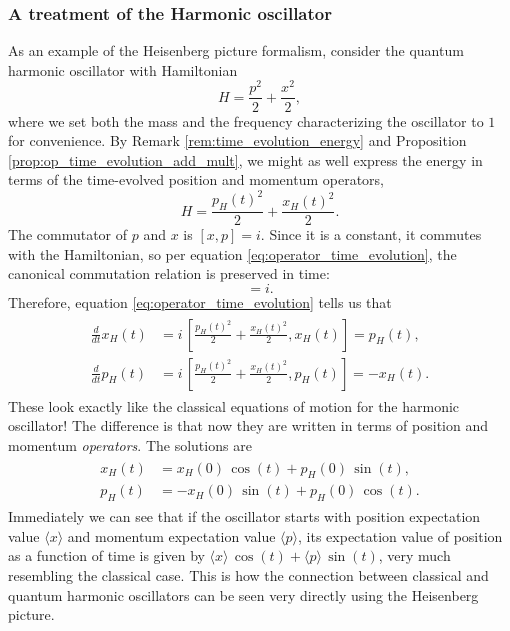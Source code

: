 \subsubsection{A treatment of the Harmonic oscillator} \label{subsub:qho_heisenberg}
As an example of the Heisenberg picture formalism, consider the quantum harmonic oscillator with Hamiltonian
\begin{equation*}
    H = \frac{p^2}{2} + \frac{x^2}{2},
\end{equation*}
where we set both the mass and the frequency characterizing the oscillator to $1$ for convenience. By Remark \ref{rem:time_evolution_energy} and Proposition \ref{prop:op_time_evolution_add_mult}, we might as well express the energy in terms of the time-evolved position and momentum operators,
\begin{equation*}
    H = \frac{p_H(t)^2}{2} + \frac{x_H(t)^2}{2}.
\end{equation*}
The commutator of $p$ and $x$ is $[x, p] = i$. Since it is a constant, it commutes with the Hamiltonian, so per equation \ref{eq:operator_time_evolution}, the canonical commutation relation is preserved in time:
\begin{equation}
    [x_H(t), p_H(t)] = i.
\end{equation}
Therefore, equation \ref{eq:operator_time_evolution} tells us that
\begin{align*} \begin{split}
    \frac{d}{dt} x_H(t) &= i \, \left[\frac{p_H(t)^2}{2} + \frac{x_H(t)^2}{2}, x_H(t)\right] = p_H(t),\\
    \frac{d}{dt} p_H(t) &= i \, \left[\frac{p_H(t)^2}{2} + \frac{x_H(t)^2}{2}, p_H(t)\right] = -x_H(t).
\end{split} \end{align*}
These look exactly like the classical equations of motion for the harmonic oscillator! The difference is that now they are written in terms of position and momentum \emph{operators}. The solutions are
\begin{align*} \begin{split}
    x_H(t) &= x_H(0) \, \cos(t) + p_H(0) \, \sin(t),\\
    p_H(t) &= -x_H(0) \, \sin(t)  +p_H(0) \, \cos(t).
\end{split} \end{align*}
Immediately we can see that if the oscillator starts with position expectation value $\langle x \rangle$ and momentum expectation value $\langle p \rangle$, its expectation value of position as a function of time is given by $\langle x \rangle \, \cos(t) + \langle p \rangle \, \sin(t)$, very much resembling the classical case. This is how the connection between classical and quantum harmonic oscillators can be seen very directly using the Heisenberg picture.

